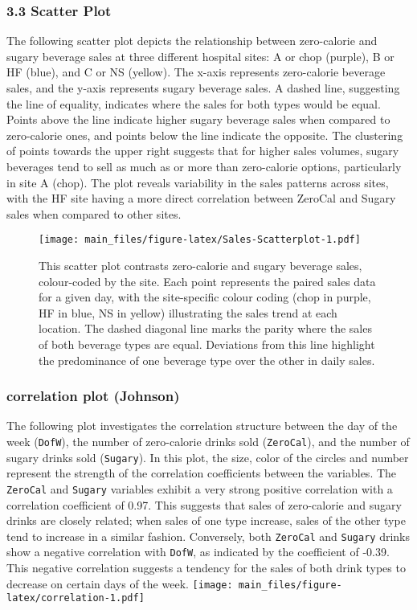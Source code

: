 \documentclass[
]{article}
\begin{document}
\hypertarget{scatter-plot}{%
\subsubsection{3.3 Scatter Plot}\label{scatter-plot}}

The following scatter plot depicts the relationship between zero-calorie
and sugary beverage sales at three different hospital sites: A or chop
(purple), B or HF (blue), and C or NS (yellow). The x-axis represents
zero-calorie beverage sales, and the y-axis represents sugary beverage
sales. A dashed line, suggesting the line of equality, indicates where
the sales for both types would be equal. Points above the line indicate
higher sugary beverage sales when compared to zero-calorie ones, and
points below the line indicate the opposite. The clustering of points
towards the upper right suggests that for higher sales volumes, sugary
beverages tend to sell as much as or more than zero-calorie options,
particularly in site A (chop). The plot reveals variability in the sales
patterns across sites, with the HF site having a more direct correlation
between ZeroCal and Sugary sales when compared to other sites.

\begin{figure}
\centering
\texttt{[image: main\_files/figure-latex/Sales-Scatterplot-1.pdf]}
\caption{This scatter plot contrasts zero-calorie and sugary beverage
sales, colour-coded by the site. Each point represents the paired sales
data for a given day, with the site-specific colour coding (chop in
purple, HF in blue, NS in yellow) illustrating the sales trend at each
location. The dashed diagonal line marks the parity where the sales of
both beverage types are equal. Deviations from this line highlight the
predominance of one beverage type over the other in daily sales.}
\end{figure}

\hypertarget{correlation-plot-johnson}{%
\subsubsection{correlation plot
(Johnson)}\label{correlation-plot-johnson}}

The following plot investigates the correlation structure between the
day of the week (\texttt{DofW}), the number of zero-calorie drinks sold
(\texttt{ZeroCal}), and the number of sugary drinks sold
(\texttt{Sugary}). In this plot, the size, color of the circles and
number represent the strength of the correlation coefficients between
the variables. The \texttt{ZeroCal} and \texttt{Sugary} variables
exhibit a very strong positive correlation with a correlation
coefficient of 0.97. This suggests that sales of zero-calorie and sugary
drinks are closely related; when sales of one type increase, sales of
the other type tend to increase in a similar fashion. Conversely, both
\texttt{ZeroCal} and \texttt{Sugary} drinks show a negative correlation
with \texttt{DofW}, as indicated by the coefficient of -0.39. This
negative correlation suggests a tendency for the sales of both drink
types to decrease on certain days of the week.
\texttt{[image: main\_files/figure-latex/correlation-1.pdf]}
\end{document}
